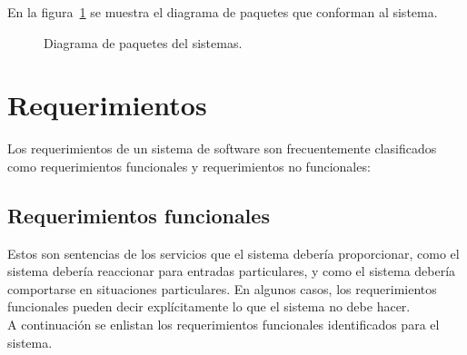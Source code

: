 	En la figura~\ref{fig:paquetes} se muestra el diagrama de paquetes que conforman al sistema.
	
	\begin{figure}[htbp!]
		\begin{center}
			\caption{Diagrama de paquetes del sistemas.}
			\label{fig:paquetes}
		\end{center}
	\end{figure}
	

\section{Requerimientos}
	
	Los requerimientos de un sistema de software son frecuentemente clasificados como requerimientos funcionales y requerimientos no funcionales: 

\subsection{Requerimientos funcionales}
	Estos son sentencias de los servicios que el sistema debería proporcionar, como el sistema debería reaccionar para entradas particulares, y como el sistema debería comportarse en situaciones particulares. En algunos casos, los requerimientos funcionales pueden decir explícitamente lo que el sistema no debe hacer. \\
	
	A continuación se enlistan los requerimientos funcionales identificados para el sistema.	
	
